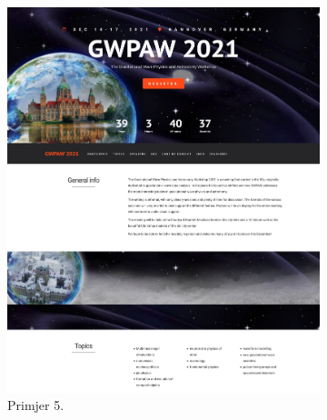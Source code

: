 		\begin{figure}[H]
			\centering
			\begin{subfigure}{0.4\linewidth}
				\addtocounter{subfigure}{4}
				\includegraphics[width=\linewidth]{slike/frontpage_example5}
				\caption{Primjer 5.}
				\label{frontpage_example5}
			\end{subfigure}
			\begin{subfigure}{0.4\linewidth}

\end{subfigure}
\end{figure}
